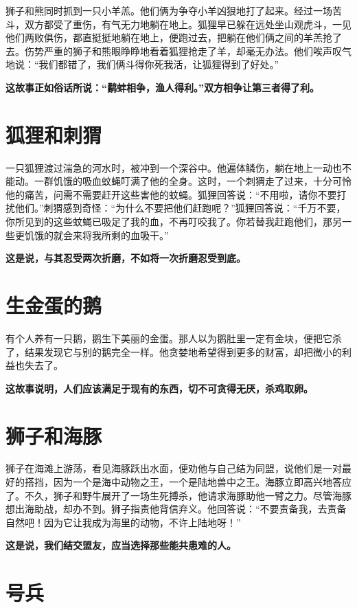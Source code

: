 狮子和熊同时抓到一只小羊羔。他们俩为争夺小羊凶狠地打了起来。经过一场苦斗，双方都受了重伤，有气无力地躺在地上。狐狸早已躲在远处坐山观虎斗，一见他们两败俱伤，都直挺挺地躺在地上，便跑过去，把躺在他们俩之间的羊羔抢了去。伤势严重的狮子和熊眼睁睁地看着狐狸抢走了羊，却毫无办法。他们唉声叹气地说：“我们都错了，我们俩斗得你死我活，让狐狸得到了好处。”

{\bfseries \color{red}这故事正如俗话所说：“鹬蚌相争，渔人得利。”双方相争让第三者得了利。}

\section{狐狸和刺猬}

一只狐狸渡过湍急的河水时，被冲到一个深谷中。他遍体鳞伤，躺在地上一动也不能动。一群饥饿的吸血蚊蝇叮满了他的全身。这时，一个刺猬走了过来，十分可怜他的痛苦，问需不需要赶开这些害他的蚊蝇。狐狸回答说：“不用啦，请你不要打扰他们。”刺猬感到奇怪：“为什么不要把他们赶跑呢？”狐狸回答说：“千万不要，你所见到的这些蚊蝇已吸足了我的血，不再叮咬我了。你若替我赶跑他们，那另一些更饥饿的就会来将我所剩的血吸干。”

{\bfseries \color{red}这是说，与其忍受两次折磨，不如将一次折磨忍受到底。}

\section{生金蛋的鹅}

有个人养有一只鹅，鹅生下美丽的金蛋。那人以为鹅肚里一定有金块，便把它杀了，结果发现它与别的鹅完全一样。他贪婪地希望得到更多的财富，却把微小的利益也失去了。

{\bfseries \color{red}这故事说明，人们应该满足于现有的东西，切不可贪得无厌，杀鸡取卵。}

\section{狮子和海豚}

狮子在海滩上游荡，看见海豚跃出水面，便劝他与自己结为同盟，说他们是一对最好的搭挡，因为一个是海中动物之王，一个是陆地兽中之王。海豚立即高兴地答应了。不久，狮子和野牛展开了一场生死搏杀，他请求海豚助他一臂之力。尽管海豚想出海助战，却办不到。狮子指责他背信弃义。他回答说：“不要责备我，去责备自然吧！因为它让我成为海里的动物，不许上陆地呀！”

{\bfseries \color{red}这是说，我们结交盟友，应当选择那些能共患难的人。}

\section{号兵}

